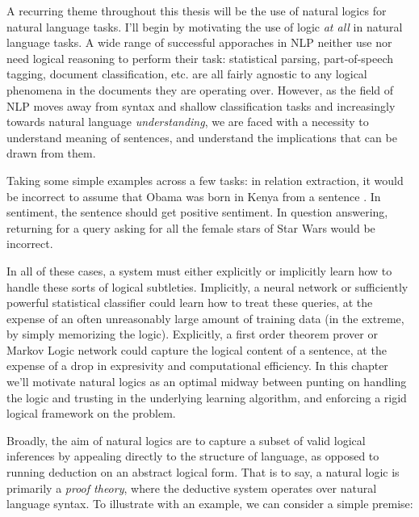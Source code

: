 A recurring theme throughout this thesis will be the use of natural
  logics for natural language tasks.
%
%
I'll begin by motivating the use of logic \textit{at all} in natural language
  tasks.
A wide range of successful apporaches in NLP neither use nor need logical reasoning 
  to perform their task:
  statistical parsing, part-of-speech tagging, document classification, etc. are all
  fairly agnostic to any logical phenomena in the documents they are operating over.
However, as the field of NLP moves away from syntax and shallow classification tasks and
  increasingly towards natural language \textit{understanding}, we are faced with a
  necessity to understand meaning of sentences, and understand the implications that can
  be drawn from them.

Taking some simple examples across a few tasks: in relation extraction, it would be
  incorrect to assume that Obama was born in Kenya from a sentence .
In sentiment, the sentence  should get positive sentiment.
In question answering, returning  for a query asking for all the female
  stars of Star Wars would be incorrect.

In all of these cases, a system must either explicitly or implicitly learn how to handle these
  sorts of logical subtleties.
Implicitly, a neural network or sufficiently powerful statistical classifier could learn how
  to treat these queries, at the expense of an often unreasonably large amount of training data
  (in the extreme, by simply memorizing the logic).
Explicitly, a first order theorem prover or Markov Logic network could capture the logical
  content of a sentence, at the expense of a drop in expresivity and computational
  efficiency.
In this chapter we'll motivate natural logics as an optimal midway between punting on handling
  the logic and trusting in the underlying learning algorithm, and enforcing a rigid
  logical framework on the problem.


%
%
Broadly, the aim of natural logics are to capture a subset of valid logical
  inferences by appealing directly to the structure of language,
  as opposed to running deduction on an abstract logical form.
That is to say, a natural logic is primarily a \textit{proof theory}, where
  the deductive system operates over natural language syntax.
To illustrate with an example, we can consider a simple premise:

